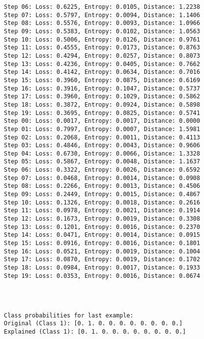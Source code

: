 \documentclass[11pt]{article}
\begin{document}
\begin{Verbatim}[commandchars=\\\{\}]
Step 06: Loss: 0.6225, Entropy: 0.0105, Distance: 1.2238
Step 07: Loss: 0.5797, Entropy: 0.0094, Distance: 1.1406
Step 08: Loss: 0.5576, Entropy: 0.0093, Distance: 1.0966
Step 09: Loss: 0.5383, Entropy: 0.0102, Distance: 1.0563
Step 10: Loss: 0.5006, Entropy: 0.0126, Distance: 0.9761
Step 11: Loss: 0.4555, Entropy: 0.0173, Distance: 0.8763
Step 12: Loss: 0.4294, Entropy: 0.0257, Distance: 0.8073
Step 13: Loss: 0.4236, Entropy: 0.0405, Distance: 0.7662
Step 14: Loss: 0.4142, Entropy: 0.0634, Distance: 0.7016
Step 15: Loss: 0.3960, Entropy: 0.0875, Distance: 0.6169
Step 16: Loss: 0.3916, Entropy: 0.1047, Distance: 0.5737
Step 17: Loss: 0.3960, Entropy: 0.1029, Distance: 0.5862
Step 18: Loss: 0.3872, Entropy: 0.0924, Distance: 0.5898
Step 19: Loss: 0.3695, Entropy: 0.0825, Distance: 0.5741
Step 00: Loss: 0.0017, Entropy: 0.0017, Distance: 0.0000
Step 01: Loss: 0.7997, Entropy: 0.0007, Distance: 1.5981
Step 02: Loss: 0.2068, Entropy: 0.0011, Distance: 0.4113
Step 03: Loss: 0.4846, Entropy: 0.0043, Distance: 0.9606
Step 04: Loss: 0.6730, Entropy: 0.0066, Distance: 1.3328
Step 05: Loss: 0.5867, Entropy: 0.0048, Distance: 1.1637
Step 06: Loss: 0.3322, Entropy: 0.0026, Distance: 0.6592
Step 07: Loss: 0.0468, Entropy: 0.0014, Distance: 0.0908
Step 08: Loss: 0.2266, Entropy: 0.0013, Distance: 0.4506
Step 09: Loss: 0.2449, Entropy: 0.0015, Distance: 0.4867
Step 10: Loss: 0.1326, Entropy: 0.0018, Distance: 0.2616
Step 11: Loss: 0.0978, Entropy: 0.0021, Distance: 0.1914
Step 12: Loss: 0.1673, Entropy: 0.0019, Distance: 0.3308
Step 13: Loss: 0.1201, Entropy: 0.0016, Distance: 0.2370
Step 14: Loss: 0.0471, Entropy: 0.0014, Distance: 0.0915
Step 15: Loss: 0.0916, Entropy: 0.0016, Distance: 0.1801
Step 16: Loss: 0.0521, Entropy: 0.0019, Distance: 0.1004
Step 17: Loss: 0.0870, Entropy: 0.0019, Distance: 0.1702
Step 18: Loss: 0.0984, Entropy: 0.0017, Distance: 0.1933
Step 19: Loss: 0.0353, Entropy: 0.0016, Distance: 0.0674
    \end{Verbatim}

    \begin{center}
    \end{center}
    { \hspace*{\fill} \\}
    
    \begin{Verbatim}[commandchars=\\\{\}]

Class probabilities for last example:
Original (Class 1): [0. 1. 0. 0. 0. 0. 0. 0. 0. 0.]
Explained (Class 1): [0. 1. 0. 0. 0. 0. 0. 0. 0. 0.]
    \end{Verbatim}


    
    
    
\end{document}
